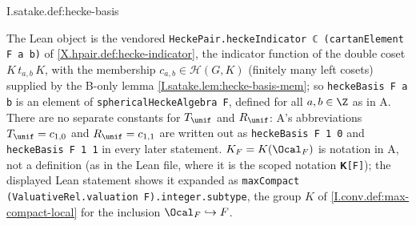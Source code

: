 \begin{definition}
\end{definition}
\begin{tfformal}{I.satake.def:hecke-basis}
\begin{tffidelity}
The Lean object is the vendored \texttt{HeckePair.heckeIndicator ℂ (cartanElement F a b)} of \cref{X.hpair.def:hecke-indicator}, the indicator function of the double coset $K\,t_{a,b}\,K$, with the membership $c_{a,b}\in\mathcal H(G,K)$ (finitely many left cosets) supplied by the B-only lemma \cref{I.satake.lem:hecke-basis-mem}; so \texttt{heckeBasis F a b} is an element of \texttt{sphericalHeckeAlgebra F}, defined for all $a,b\in\Z$ as in A. There are no separate constants for $T_\unif$ and $R_\unif$: A's abbreviations $T_\unif=c_{1,0}$ and $R_\unif=c_{1,1}$ are written out as \texttt{heckeBasis F 1 0} and \texttt{heckeBasis F 1 1} in every later statement. $K_F=K(\Ocal_F)$ is notation in A, not a definition (as in the Lean file, where it is the scoped notation \texttt{𝐊[F]}); the displayed Lean statement shows it expanded as \texttt{maxCompact (ValuativeRel.valuation F).integer.subtype}, the group $K$ of \cref{I.conv.def:max-compact-local} for the inclusion $\Ocal_F\hookrightarrow F$.
\end{tffidelity}
\end{tfformal}

